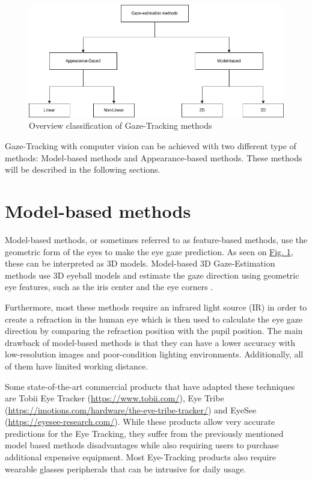 \begin{figure}
    \centering
    \includegraphics[scale=0.3]{img/figures/methods_classification.png}
    \caption{Overview classification of Gaze-Tracking methods }
    \label{GEClassification}
 \end{figure}


Gaze-Tracking with computer vision can be achieved with two different type of methods: Model-based methods and Appearance-based methods. These methods will be described in the following sections.

\section{Model-based methods}
Model-based methods, or sometimes referred to as feature-based methods, use the geometric form of the eyes to make the eye gaze prediction.
As seen on \hyperref[GEClassification]{Fig. 1}, these can be interpreted as 3D models. Model-based 3D Gaze-Estimation
methods use 3D eyeball models and estimate the gaze direction using geometric eye features, such as the iris center and the eye corners \cite{general_theory_remote_gaze_3d_model}.

Furthermore, most these methods require an infrared light source (IR) in order to create a refraction in the human eye which is then used to calculate the eye gaze direction by comparing the refraction position with the pupil position. The main drawback of model-based methods is that they can have a lower accuracy with low-resolution images and poor-condition lighting environments. Additionally, all of them have limited working distance.

Some state-of-the-art commercial products that have adapted these techniques are Tobii Eye Tracker (\url{https://www.tobii.com/}), Eye Tribe (\url{https://imotions.com/hardware/the-eye-tribe-tracker/}) and EyeSee (\url{https://eyesee-research.com/}). 
While these products allow very accurate predictions for the Eye Tracking, they suffer from the previously mentioned model based methods disadvantages while also requiring users to purchase additional expensive equipment. Most Eye-Tracking products also require wearable glasses peripherals that can be intrusive for daily usage. 

